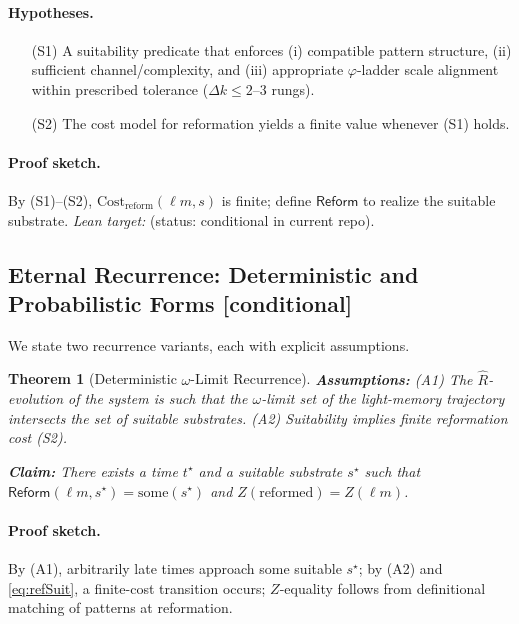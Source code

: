 \documentclass[11pt,letterpaper]{article}
\newcommand{\lean}[1]{\texttt{\detokenize{#1}}}
\newtheorem{theorem}{Theorem}[section]
\theoremstyle{definition}
\theoremstyle{remark}
\begin{document}
\paragraph{Hypotheses.}
\begin{itemize}
  \item[(S1)] A suitability predicate that enforces (i) compatible pattern structure, (ii) sufficient channel/complexity, and (iii) appropriate \(\varphi\)-ladder scale alignment within prescribed tolerance (\(\Delta k\le 2\)--\(3\) rungs).
  \item[(S2)] The cost model for reformation yields a finite value whenever (S1) holds.
\end{itemize}

\paragraph{Proof sketch.}
By (S1)--(S2), \(\mathrm{Cost}_{\mathrm{reform}}(\ell m, s)\) is finite; define \(\mathsf{Reform}\) to realize the suitable substrate. \emph{Lean target:} \lean{reformation_inevitable} (status: conditional in current repo).

\subsection{Eternal Recurrence: Deterministic and Probabilistic Forms \texorpdfstring{\textsf{[conditional]}}{[conditional]}}

We state two recurrence variants, each with explicit assumptions.

\begin{theorem}[Deterministic \texorpdfstring{\(\omega\)}{ω}-Limit Recurrence]\label{thm:recurrence_det}
\textbf{Assumptions:} (A1) The \(\widehat{R}\)-evolution of the system is such that the \(\omega\)-limit set of the light-memory trajectory intersects the set of suitable substrates. (A2) Suitability implies finite reformation cost (S2).

\textbf{Claim:} There exists a time \(t^{\star}\) and a suitable substrate \(s^{\star}\) such that \(\mathsf{Reform}(\ell m, s^{\star})=\mathrm{some}(s^{\star})\) and \(Z(\text{reformed})=Z(\ell m)\).
\end{theorem}

\paragraph{Proof sketch.}
By (A1), arbitrarily late times approach some suitable \(s^{\star}\); by (A2) and \eqref{eq:refSuit}, a finite-cost transition occurs; \(Z\)-equality follows from definitional matching of patterns at reformation.
\end{document}
